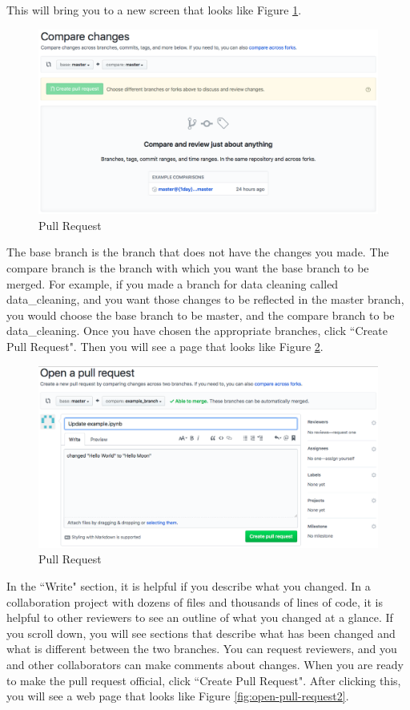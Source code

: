 \documentclass[11pt,a4paper]{article}
\begin{document}
This will bring you to a new screen that looks like Figure \ref{fig:pull-request2}.

\begin{figure}[h!]
\centering
\includegraphics[width=.7\textwidth]{figures/pull_request2.png}
\caption{Pull Request}
\label{fig:pull-request2}
\end{figure}

The base branch is the branch that does not have the changes you made.
The compare branch is the branch with which you want the base branch to be merged.
For example, if you made a branch for data cleaning called data\_cleaning, and you want those changes to be reflected in the master branch, you would choose the base branch to be master, and the compare branch to be data\_cleaning.
Once you have chosen the appropriate branches, click ``Create Pull Request".
Then you will see a page that looks like Figure \ref{fig:open-pull-request}.

\begin{figure}[h!]
\centering
\includegraphics[width=.7\textwidth]{figures/open_pull_request.png}
\caption{Pull Request}
\label{fig:open-pull-request}
\end{figure}

In the ``Write" section, it is helpful if you describe what you changed.
In a collaboration project with dozens of files and thousands of lines of code, it is helpful to other reviewers to see an outline of what you changed at a glance.
If you scroll down, you will see sections that describe what has been changed and what is different between the two branches.
You can request reviewers, and you and other collaborators can make comments about changes.
When you are ready to make the pull request official, click ``Create Pull Request".
After clicking this, you will see a web page that looks like Figure \ref{fig:open-pull-request2}.
\end{document}
